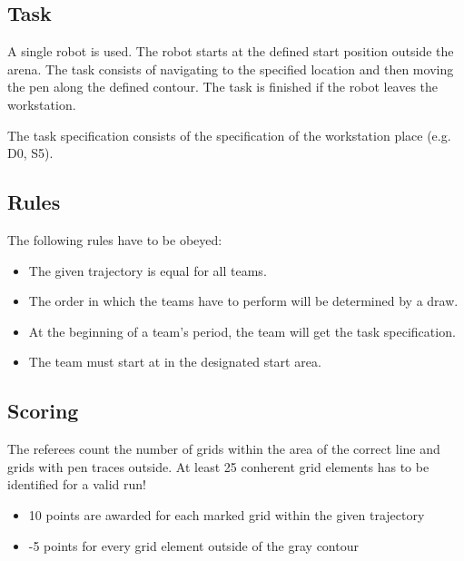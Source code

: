\subsection{Task}
A single robot is used. The robot starts at the defined start position outside
the arena. The task consists of navigating to the specified location and then
moving the pen along the defined contour. The task is finished if the robot
leaves the workstation.
\par
The task specification consists of the specification of the workstation place
(e.g. D0, S5).

\subsection{Rules}
The following rules have to be obeyed:

\begin{itemize}
\item The given trajectory is equal for all teams.
\item The order in which the teams have to perform will be determined by a draw.
\item At the beginning of a team's period, the team will get the task
      specification.
\item The team must start at in the designated start area.
\end{itemize}

\subsection{Scoring}
The referees count the number of grids within the area of the correct line and
grids with pen traces outside. At least 25 conherent grid elements has to be
identified for a valid run!

\begin{itemize}
\item 10 points are awarded for each marked grid within the given trajectory
\item -5 points for every grid element outside of the gray contour
\end{itemize}

